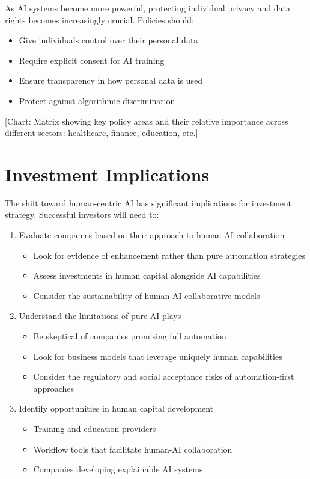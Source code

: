 \documentclass[
  Letterpaper,
]{scrbook}
\providecommand{\tightlist}{%
  \setlength{\itemsep}{0pt}\setlength{\parskip}{0pt}}\usepackage{longtable,booktabs,array}
\begin{document}
As AI systems become more powerful, protecting individual privacy and
data rights becomes increasingly crucial. Policies should:

\begin{itemize}
\tightlist
\item
  Give individuals control over their personal data
\item
  Require explicit consent for AI training
\item
  Ensure transparency in how personal data is used
\item
  Protect against algorithmic discrimination
\end{itemize}

{[}Chart: Matrix showing key policy areas and their relative importance
across different sectors: healthcare, finance, education, etc.{]}

\section{Investment Implications}\label{investment-implications-3}

The shift toward human-centric AI has significant implications for
investment strategy. Successful investors will need to:

\begin{enumerate}
\def\labelenumi{\arabic{enumi}.}
\tightlist
\item
  Evaluate companies based on their approach to human-AI collaboration

  \begin{itemize}
  \tightlist
  \item
    Look for evidence of enhancement rather than pure automation
    strategies
  \item
    Assess investments in human capital alongside AI capabilities
  \item
    Consider the sustainability of human-AI collaborative models
  \end{itemize}
\item
  Understand the limitations of pure AI plays

  \begin{itemize}
  \tightlist
  \item
    Be skeptical of companies promising full automation
  \item
    Look for business models that leverage uniquely human capabilities
  \item
    Consider the regulatory and social acceptance risks of
    automation-first approaches
  \end{itemize}
\item
  Identify opportunities in human capital development

  \begin{itemize}
  \tightlist
  \item
    Training and education providers
  \item
    Workflow tools that facilitate human-AI collaboration
  \item
    Companies developing explainable AI systems
  \end{itemize}
\end{enumerate}
\end{document}
